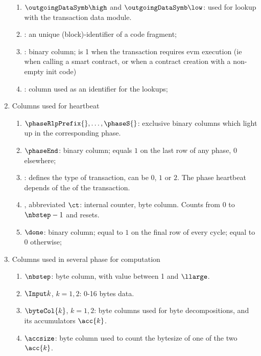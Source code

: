 \begin{enumerate}
\begin{enumerate}
            \item $\outgoingDataSymb\high$ and $\outgoingDataSymb\low$:
                used for lookup with the transaction data module.
            \item \CFI{}: 
                an unique (block)-identifier of a code fragment;
            \item \txRequiresEvmExecution{}:
                binary column; is 1 when the transaction requires evm execution (ie when calling a smart contract, or when a contract creation with a non-empty init code)
            \item \Phase{}:
                column used as an identifier for the lookups;
        \end{enumerate}
    \item Columns used for heartbeat
        \begin{enumerate}
            \item $\phaseRlpPrefix{}, \dots, \phaseS{}$:
                exclusive binary columns which light up in the corresponding phase.
            \item $\phaseEnd$:
                binary column; equals $1$ on the last row of any phase, $0$ elsewhere;
            \item \txType{}:
                defines the type of transaction, can be $0$, $1$ or $2$. The phase heartbeat depends of the \transactionType{} of the transaction.
            \item \CT{}, abbreviated $\ct$:
                internal counter, byte column. Counts from 0 to $\nbstep - 1$ and resets.
            \item $\done$:
                binary column; equal to $1$ on the final row of every \ct{} cycle; equal to $0$ otherwise;
        \end{enumerate}
    \item Columns used in several phase for computation
        \begin{enumerate}
            \item $\nbstep$:
                byte column, with value between 1 and $\llarge$.
            \item $\Input k$, $k=1,2$:
                0-16 bytes data.
            \item $\byteCol{k}$, $k=1,2$:
                byte columns used for byte decompositions, and its accumulators $\acc{k}$.
            \item $\accsize$:
                byte column used to count the bytesize of one of the two $\acc{k}$.

\end{enumerate}
\end{enumerate}
